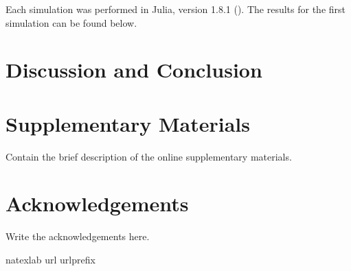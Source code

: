 \documentclass[12pt]{article} %
\theoremstyle{definition}
\begin{document}
Each simulation was performed in Julia, version 1.8.1 (\cite{Bezanson}). The results for the first simulation can be found below.





\section{Discussion and Conclusion}

\section*{Supplementary Materials}

Contain
the brief description of the online supplementary materials.
\par
\section*{Acknowledgements}

Write the acknowledgements here.
\par



\bibhang=1.7pc
\bibsep=2pt
\fontsize{9}{14pt plus.8pt minus .6pt}\selectfont
\renewcommand\bibname{\large \bf References}
\expandafter\ifx\csname
natexlab\endcsname\relax\def\natexlab#1{#1}\fi
\expandafter\ifx\csname url\endcsname\relax
  \def\url#1{\texttt{#1}}\fi
\expandafter\ifx\csname urlprefix\endcsname\relax\def\urlprefix{URL}\fi



\end{document}

